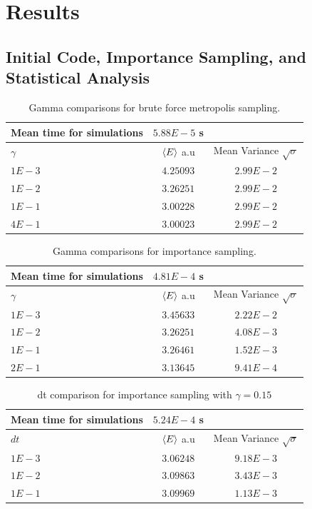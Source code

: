 \section{Results}
\subsection{Initial Code, Importance Sampling, and Statistical Analysis}



\begin{table}
\begin{tabular}{l|c|c}
	Mean time for simulations & $5.88E-5$ s & \\
	\hline
	$\gamma$ & $\langle E \rangle$ a.u & Mean Variance $\sqrt{\sigma}$\\
	\hline
	$1E-3$ & $4.25093$ & $2.99E-2$ \\
	$1E-2$ & $3.26251$ & $2.99E-2$ \\
	$1E-1$ & $3.00228$ & $2.99E-2$ \\
	$4E-1$ & $3.00023$ & $2.99E-2$ \\
\end{tabular}
\label{tab:naive-nin}
\caption{Gamma comparisons for brute force metropolis sampling.}
\end{table}

\begin{table}
\begin{tabular}{l|c|c}
	Mean time for simulations & $4.81E-4$ s & \\
	\hline
	$\gamma$ & $\langle E \rangle$ a.u & Mean Variance $\sqrt{\sigma}$\\
	\hline
	$1E-3$ & $3.45633$ & $2.22E-2$ \\
	$1E-2$ & $3.26251$ & $4.08E-3$ \\
	$1E-1$ & $3.26461$ & $1.52E-3$ \\
	$2E-1$ & $3.13645$ & $9.41E-4$ \\
\end{tabular}
\label{tab:importance-nin-gamma}
\caption{Gamma comparisons for importance sampling.}
\end{table}

\begin{table}
\begin{tabular}{l|c|c}
	Mean time for simulations & $5.24E-4$ s & \\
	\hline
	$dt$ & $\langle E \rangle$ a.u & Mean Variance $\sqrt{\sigma}$\\
	\hline
	$1E-3$ & $3.06248$ & $9.18E-3$ \\
	$1E-2$ & $3.09863$ & $3.43E-3$ \\
	$1E-1$ & $3.09969$ & $1.13E-3$ \\
\end{tabular}
\label{tab:importance-nin-dt}
\caption{dt comparison for importance sampling with $\gamma = 0.15$}
\end{table}

